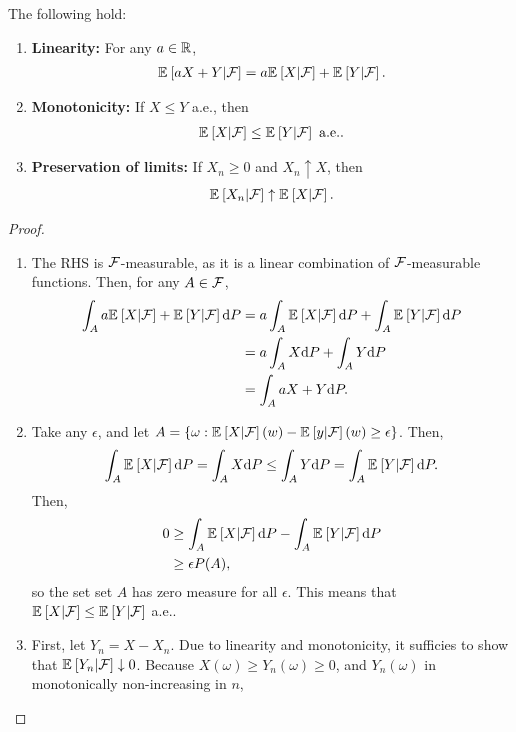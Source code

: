 \begin{prop}
    The following hold:
    \begin{enumerate}
        \item {\bf Linearity:} For any $a \in \mathbb{R}$,
        \begin{align*}
            {\mathbb E}_{}\left[aX + Y | \mathcal{F}\right] = a{\mathbb E}_{}\left[X | \mathcal{F}\right] + {\mathbb E}_{}\left[Y | \mathcal{F}\right].
        \end{align*}
        \item {\bf Monotonicity:} If $X \leq Y$ a.e., then 
        \begin{align*}
            {\mathbb E}_{}\left[X | \mathcal{F}\right] \leq {\mathbb E}_{}\left[Y | \mathcal{F}\right] \text{ a.e.}.
        \end{align*}
        \item {\bf Preservation of limits:} If $X_n \geq 0$ and $X_n \uparrow X$, then
        \begin{align*}
            {\mathbb E}_{}\left[X_n | \mathcal{F}\right] \uparrow {\mathbb E}_{}\left[X | \mathcal{F}\right].
        \end{align*}
    \end{enumerate}
\end{prop}
\begin{proof}
    \begin{enumerate}
        \item The RHS is $\mathcal{F}$-measurable, as it is a linear combination of $\mathcal{F}$-measurable functions. Then, for any $A \in \mathcal{F}$,
        \begin{align*}
            \int_A a{\mathbb E}_{}\left[X | \mathcal{F}\right] + {\mathbb E}_{}\left[Y | \mathcal{F}\right] \text{d} P &= a \int_A {\mathbb E}_{}\left[X | \mathcal{F}\right] \text{d} P +  \int_A {\mathbb E}_{}\left[Y | \mathcal{F}\right] \text{d} P\\
            &= a \int_A X \text{d} P +  \int_A Y \text{d} P\\
            &= \int_A aX + Y \text{d} P.
        \end{align*}
        \item Take any $\epsilon$, and let $A = \{\omega: {\mathbb E}_{}\left[X | \mathcal{F}\right](w) - {\mathbb E}_{}\left[y | \mathcal{F}\right](w) \geq \epsilon\}$. Then,
        \begin{align*}
            \int_A {\mathbb E}_{}\left[X | \mathcal{F}\right] \text{d} P = \int_A X \text{d} P \leq \int_A Y \text{d} P = \int_A {\mathbb E}_{}\left[Y | \mathcal{F}\right] \text{d} P.
        \end{align*}
        Then,
        \begin{align*}
            0 &\geq \int_A {\mathbb E}_{}\left[X | \mathcal{F}\right] \text{d} P -  \int_A {\mathbb E}_{}\left[Y | \mathcal{F}\right] \text{d} P\\
            &\geq \epsilon P(A),
        \end{align*}
        so the set set $A$ has zero measure for all $\epsilon$. This means that ${\mathbb E}_{}\left[X | \mathcal{F}\right] \leq {\mathbb E}_{}\left[Y | \mathcal{F}\right]$ a.e..
        \item First, let $Y_n = X - X_n$. Due to linearity and monotonicity, it sufficies to show that ${\mathbb E}_{}\left[Y_n | \mathcal{F}\right] \downarrow 0$. Because $X(\omega) \geq Y_n(\omega) \geq 0$, and $Y_n(\omega)$ in monotonically non-increasing in $n$,  
    \end{enumerate}
\end{proof}

